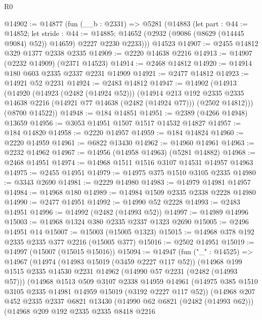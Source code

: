 \begin{lexlean}{R0}
\begin{coremodule}
@14902 := @14877
    (fun (__b : @2331) =>
    @5281
      (@14883
        (let part : @44 := @14852;
        let stride : @44 := @14885;
        @14652 (@2932 (@9086 (@8629 (@14445 @9084) @52)) @14659) @2227 @2230 @2233)))
    @14523
@14907 := @2455 @14812 @329 @1377 @2338 @2335
@14909 := @2220 @14638 @2216
@14913 := @14907 (@2232 @14909) (@2371 @14523)
@14914 := @2468 @14812
@14920 := @14914 @180 @603 @2335 @2337 @2231 @14909
@14921 := @2477 @14812
@14923 := @14921 @52 @2231
@14924 := @2483 @14812
@14947 := @14902
    (@14913
      (@14920
        (@14923 (@2482 (@14924 @52)))
        (@14914
          @213
          @192
          @2335
          @2335
          @14638
          @2216
          (@14921 @77 @14638 (@2482 (@14924 @77)))
          (@2502 @14812)))
      (@8700 @14522))
@14948 := @184 @14851
@14951 := @2389 (@4266 @14948) @13659
@14956 := @3053 @14951 @1507 @1517 @14532 @14827
@14957 := @184 @14820
@14958 := @2220 @14957
@14959 := @184 @14824
@14960 := @2220 @14959
@14961 := @6822 @13430
@14962 := @14960 @14961
@14963 := @2232 @14962
@14967 := @14956 (@14958 @14963) (@5281 @14882)
@14968 := @2468 @14951
@14974 := @14968 @1511 @1516 @3107 @14531 @14957 @14963
@14975 := @2455 @14951
@14979 := @14975 @375 @1510 @3105 @2335
@14980 := @3343 @2690
@14981 := @2229 @14980
@14983 := @14979 @14981 @14957
@14984 := @14968 @180
@14989 := @14984 @1509 @2335 @2338 @2228 @14980
@14990 := @2477 @14951
@14992 := @14990 @52 @2228
@14993 := @2483 @14951
@14996 := @14992 (@2482 (@14993 @52))
@14997 := @14989 @14996
@15003 := @14968 @1324 @380 @2335 @2337 @1323 @2690
@15005 := @2496 @14951 @14
@15007 := @15003 (@15005 @1323)
@15015 := @14968 @378 @192 @2335 @2335 @377 @2216 (@15005 @377)
@15016 := @2502 @14951
@15019 := @14997 (@15007 (@15015 @15016))
@15094 := @14947
    (fun ("_" : @14525) =>
    @14967
      (@14974
        (@14983 @15019 (@3459 @2227 @117 @52))
        (@14968
          @199
          @1515
          @2335
          @14530
          @2231
          @14962
          (@14990 @57 @2231 (@2482 (@14993 @57)))
          (@14968
            @1513
            @509
            @3107
            @2338
            @14959
            @14961
            (@14975 @385 @1510 @3105 @2335 @14981 @14959 @15019 (@3192 @2227 @117 @52))
            (@14968
              @207
              @452
              @2335
              @2337
              @6821
              @13430
              (@14990 @62 @6821 (@2482 (@14993 @62)))
              (@14968
                @209
                @192
                @2335
                @2335
                @8418
                @2216

\end{coremodule}
\end{lexlean}
